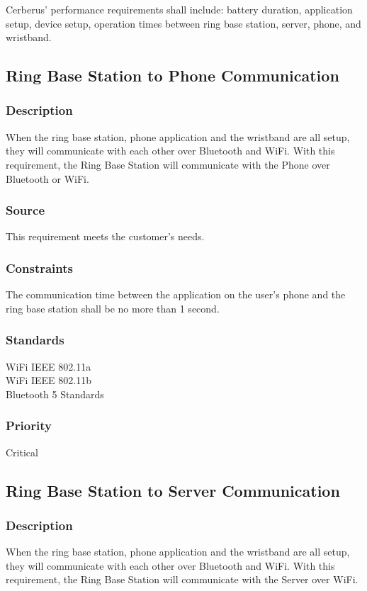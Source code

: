 Cerberus' performance requirements shall include: battery duration, application setup, device setup, operation times between ring base station, server, phone, and wristband.

\subsection{Ring Base Station to Phone Communication}
\subsubsection{Description}
When the ring base station, phone application and the wristband are all setup, they will communicate with each other over Bluetooth and WiFi. With this requirement, the Ring Base Station will communicate with the Phone over Bluetooth or WiFi.
\subsubsection{Source}
This requirement meets the customer's needs.
\subsubsection{Constraints}
The communication time between the application on the user's phone and the ring base station shall be no more than 1 second.
\subsubsection{Standards}
WiFi IEEE 802.11a
\\WiFi IEEE 802.11b
\\Bluetooth 5 Standards
\subsubsection{Priority}
Critical 

\subsection{Ring Base Station to Server Communication}
\subsubsection{Description}
When the ring base station, phone application and the wristband are all setup, they will communicate with each other over Bluetooth and WiFi. With this requirement, the Ring Base Station will communicate with the Server over WiFi.

